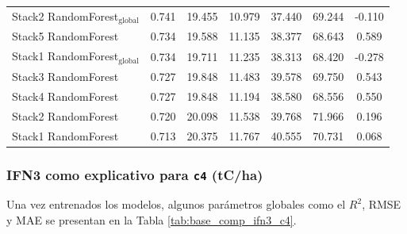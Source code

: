\begin{table}
{\begin{tabular}{p{4.5cm}cccccc}
        Stack2 RandomForest$_{\text{global}}$ & 0.741 & 19.455 & 10.979 & 37.440 & 69.244 & -0.110 \\
        Stack5 RandomForest & 0.734 & 19.588 & 11.135 & 38.377 & 68.643 & 0.589 \\
        Stack1 RandomForest$_{\text{global}}$ & 0.734 & 19.711 & 11.235 & 38.313 & 68.420 & -0.278 \\
        Stack3 RandomForest & 0.727 & 19.848 & 11.483 & 39.578 & 69.750 & 0.543 \\
        Stack4 RandomForest & 0.727 & 19.848 & 11.194 & 38.580 & 68.556 & 0.550 \\
        Stack2 RandomForest & 0.720 & 20.098 & 11.538 & 39.768 & 71.966 & 0.196 \\
        Stack1 RandomForest & 0.713 & 20.375 & 11.767 & 40.555 & 70.731 & 0.068 \\
            \bottomrule
    \end{tabular}
    }
\end{table}

\subsubsection{IFN3 como explicativo para \texttt{c4} (tC/ha)}


Una vez entrenados los modelos, algunos parámetros globales como el $R^2$, RMSE y MAE se presentan en la Tabla \ref{tab:base_comp_ifn3_c4}.


